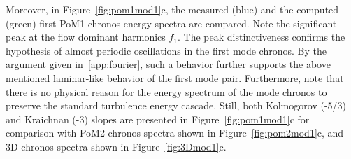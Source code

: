 Moreover, in Figure~\ref{fig:pom1mod1}{c}, the measured (blue) and the computed (green) first PoM1 chronos energy spectra are compared. Note the significant peak at the flow dominant {harmonics} $f_1$. The peak distinctiveness confirms the hypothesis of almost periodic oscillations in the first mode chronos. {By the argument given in~\ref{app:fourier}, such a behavior further supports the above mentioned laminar-like behavior of the first mode pair.} Furthermore, note that there is no physical reason for the energy spectrum of the mode chronos to preserve the standard turbulence energy cascade. {Still, both Kolmogorov (-5/3) and Kraichnan (-3) slopes are presented in Figure~\ref{fig:pom1mod1}c for comparison with PoM2 chronos spectra shown in Figure~\ref{fig:pom2mod1}c, and 3D chronos spectra shown in Figure~\ref{fig:3Dmod1}c.}


